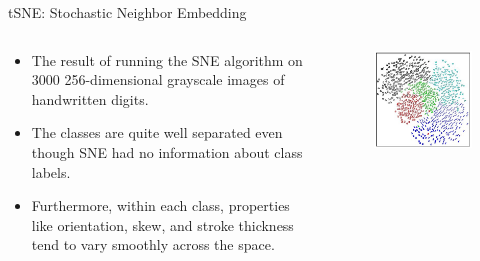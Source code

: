 \begin{frame}[allowframebreaks]{tSNE: Stochastic Neighbor Embedding}
    \begin{columns}
    \begin{column}{0.4\textwidth}
        \begin{itemize}
            \item The result of running the SNE algorithm on 3000 256-dimensional grayscale images of handwritten digits.
            \item The classes are quite well separated even though SNE had no information about class labels.
            \item Furthermore, within each class, properties like orientation, skew, and stroke thickness tend to vary smoothly across the space.
        \end{itemize}
    \end{column}
    \begin{column}{0.6\textwidth}
        \begin{figure}
            \centering
            \includegraphics[width=1\textwidth,keepaspectratio]{images/dul/dim-reduce/tsne-result-1.png}
        \end{figure}
    \end{column}
    \end{columns}
\end{frame}

